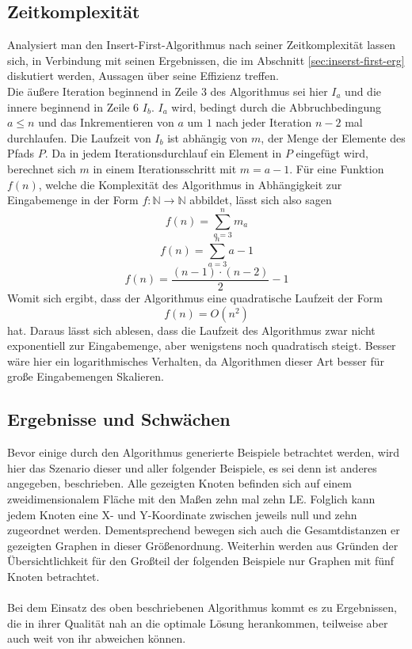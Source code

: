 \subsection{Zeitkomplexität}\label{sec:time-comp-first}
Analysiert man den Insert-First-Algorithmus nach seiner Zeitkomplexität lassen sich, in Verbindung mit seinen Ergebnissen, die im Abschnitt \vref{sec:inserst-first-erg} diskutiert werden, Aussagen über seine Effizienz treffen.
\\
Die äußere Iteration beginnend in Zeile 3 des Algorithmus sei hier $I_a$ und die innere beginnend in Zeile 6 $I_b$.
$I_a$ wird, bedingt durch die Abbruchbedingung $a\leq n$ und das Inkrementieren von $a$ um $1$ nach jeder Iteration $n-2$ mal durchlaufen.
Die Laufzeit von $I_b$ ist abhängig von $m$, der Menge der Elemente des Pfads $P$.
Da in jedem Iterationsdurchlauf ein Element in $P$ eingefügt wird, berechnet sich $m$ in einem Iterationsschritt mit $m=a-1$.
Für eine Funktion $f(n)$, welche die Komplexität des Algorithmus in Abhängigkeit zur Eingabemenge in der Form $f: \mathbb{N} \rightarrow \mathbb{N}$ abbildet, lässt sich also sagen
$$f(n) = \sum_{a = 3}^n m_a$$
$$f(n) = \sum_{a=3}^n a - 1$$
$$f(n) = \frac{(n-1)\cdot (n-2)}{2}-1$$
Womit sich ergibt, dass der Algorithmus eine quadratische Laufzeit der Form
$$f(n) = O(n^2)$$
hat.
Daraus lässt sich ablesen, dass die Laufzeit des Algorithmus zwar nicht exponentiell zur Eingabemenge, aber wenigstens noch quadratisch steigt.
Besser wäre hier ein logarithmisches Verhalten, da Algorithmen dieser Art besser für große Eingabemengen Skalieren.\autocite[S. 9ff.]{Gurski.2010}


\subsection{Ergebnisse und Schwächen} \label{sec:inserst-first-erg}
Bevor einige durch den Algorithmus generierte Beispiele betrachtet werden, wird hier das Szenario dieser und aller folgender Beispiele, es sei denn ist anderes angegeben, beschrieben.
Alle gezeigten Knoten befinden sich auf einem zweidimensionalem Fläche mit den Maßen zehn mal zehn \ac{LE}.
Folglich kann jedem Knoten eine X- und Y-Koordinate zwischen jeweils null und zehn zugeordnet werden. 
Dementsprechend bewegen sich auch die Gesamtdistanzen er gezeigten Graphen in dieser Größenordnung.
Weiterhin werden aus Gründen der Übersichtlichkeit für den Großteil der folgenden Beispiele nur Graphen mit fünf Knoten betrachtet.
\\\\
Bei dem Einsatz des oben beschriebenen Algorithmus kommt es zu Ergebnissen, die in ihrer Qualität nah an die optimale Lösung herankommen, teilweise aber auch weit von ihr abweichen können.  

